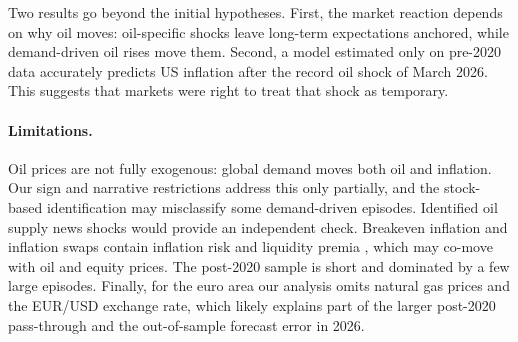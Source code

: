 \documentclass[11pt,a4paper]{article}
\begin{document}
Two results go beyond the initial hypotheses. First, the market reaction depends on why oil moves: oil-specific shocks leave long-term expectations anchored, while demand-driven oil rises move them. Second, a model estimated only on pre-2020 data accurately predicts US inflation after the record oil shock of March 2026. This suggests that markets were right to treat that shock as temporary.

\paragraph{Limitations.} Oil prices are not fully exogenous: global demand moves both oil and inflation. Our sign and narrative restrictions address this only partially, and the stock-based identification may misclassify some demand-driven episodes. Identified oil supply news shocks \citep{kanzig2021} would provide an independent check. Breakeven inflation and inflation swaps contain inflation risk and liquidity premia \citep{damico2018}, which may co-move with oil and equity prices. The post-2020 sample is short and dominated by a few large episodes. Finally, for the euro area our analysis omits natural gas prices and the EUR/USD exchange rate, which likely explains part of the larger post-2020 pass-through and the out-of-sample forecast error in 2026.
\end{document}

